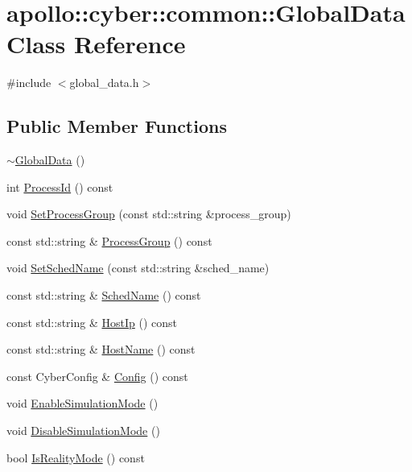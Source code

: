 \hypertarget{classapollo_1_1cyber_1_1common_1_1GlobalData}{\section{apollo\-:\-:cyber\-:\-:common\-:\-:Global\-Data Class Reference}
\label{classapollo_1_1cyber_1_1common_1_1GlobalData}
}


{\ttfamily \#include $<$global\-\_\-data.\-h$>$}

\subsection*{Public Member Functions}
\begin{DoxyCompactItemize}
\item 
\hyperlink{classapollo_1_1cyber_1_1common_1_1GlobalData_a3b09d9ae8e74fcef1cae2bf4f5158bf1}{$\sim$\-Global\-Data} ()
\item 
int \hyperlink{classapollo_1_1cyber_1_1common_1_1GlobalData_a2f1b262b59b5a1e2176abf605675445e}{Process\-Id} () const 
\item 
void \hyperlink{classapollo_1_1cyber_1_1common_1_1GlobalData_a4d223acbe0c85c107370c9b896c211f2}{Set\-Process\-Group} (const std\-::string \&process\-\_\-group)
\item 
const std\-::string \& \hyperlink{classapollo_1_1cyber_1_1common_1_1GlobalData_a3e25c18dbd9c16898961d4a074c748f5}{Process\-Group} () const 
\item 
void \hyperlink{classapollo_1_1cyber_1_1common_1_1GlobalData_a21d271e642503138b530ed46d67e00df}{Set\-Sched\-Name} (const std\-::string \&sched\-\_\-name)
\item 
const std\-::string \& \hyperlink{classapollo_1_1cyber_1_1common_1_1GlobalData_abf1643620bdf25ad1016a03e7841ae1c}{Sched\-Name} () const 
\item 
const std\-::string \& \hyperlink{classapollo_1_1cyber_1_1common_1_1GlobalData_aa946201520faeded91601a50617fa74a}{Host\-Ip} () const 
\item 
const std\-::string \& \hyperlink{classapollo_1_1cyber_1_1common_1_1GlobalData_a00072980ed047a9688ac219b056fb163}{Host\-Name} () const 
\item 
const Cyber\-Config \& \hyperlink{classapollo_1_1cyber_1_1common_1_1GlobalData_a08aae1b46abb6128259bffa1946e40fe}{Config} () const 
\item 
void \hyperlink{classapollo_1_1cyber_1_1common_1_1GlobalData_a84d3895acc1aac14760fd5fe99073ce3}{Enable\-Simulation\-Mode} ()
\item 
void \hyperlink{classapollo_1_1cyber_1_1common_1_1GlobalData_a7dc766c13bcbd249bd2a1005045f174f}{Disable\-Simulation\-Mode} ()
\item 
bool \hyperlink{classapollo_1_1cyber_1_1common_1_1GlobalData_a67841cc056f7409327d6311361620868}{Is\-Reality\-Mode} () const 
\end{DoxyCompactItemize}
